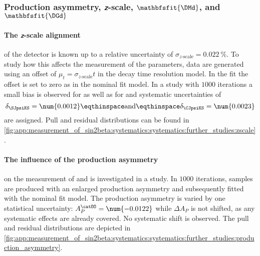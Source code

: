 \subsubsection[Production asymmetry, $z$-scale, \DMd, and \DGd]{Production asymmetry, $\mathbfsfit{z}$-scale, $\mathbfsfit{\DMd}$, and $\mathbfsfit{\DGd}$}
\label{sec:measurement_of_sin2beta:systematics:systematics:further_studies}

\paragraph{The $\mathbfsfit{z}$-scale alignment} of the \LHCb detector is known
up to a relative uncertainty of $\sigma_\text{$z$-scale} =
\SI{0.022}{\percent}$. To study how this affects the measurement of the \CP
parameters, data are generated using an offset of $\mu_{t} =
\sigma_\text{$z$-scale} t$ in the decay time resolution model. In the fit the
offset is set to zero as in the nominal fit model. In a \ToyMC study with
$\num{1000}$ iterations a small bias is observed for \SJpsiKS as well as for
\CJpsiKS and systematic uncertainties of
%
\begin{equation}
  \delta_{\SJpsiKS} = \num{0.0012}\eqthinspace\text{and}\eqthinspace\delta_{\CJpsiKS} = \num{0.0023}
\end{equation}
%
are assigned. Pull and residual distributions can be found in
\cref{fig:app:measurement_of_sin2beta:systematics:systematics:further_studies:zscale}.

\paragraph{The influence of the production asymmetry} on the measurement of
\SJpsiKS and \CJpsiKS is investigated in a \ToyMC study. In $\num{1000}$
iterations, samples are produced with an enlarged production asymmetry and
subsequently fitted with the nominal fit model. The production asymmetry is
varied by one statistical uncertainty: $A_P^{\catOO} = \num{-0.0122}$ while
$\Delta A_P$ is not shifted, as any systematic effects are already covered. No
systematic shift is observed. The pull and residual distributions are depicted
in \cref{fig:app:measurement_of_sin2beta:systematics:systematics:further_studies:production_asymmetry}.

